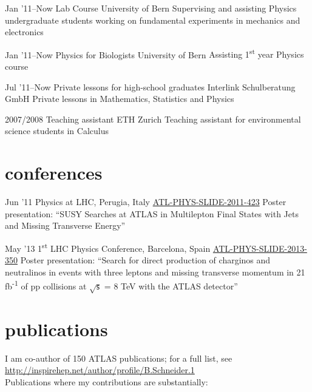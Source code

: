\documentclass[]{cv} %
\begin{document}
\begin{entrylist}

\entry
{Jan '11--Now}
{Lab Course}
{University of Bern}
{Supervising and assisting Physics undergraduate students working on fundamental experiments in mechanics and electronics}

\entry
{Jan '11--Now}
{Physics for Biologists}
{University of Bern}
{Assisting 1\textsuperscript{st} year Physics course}

\entry
{Jul '11--Now}
{Private lessons for high-school graduates}
{Interlink Schulberatung GmbH}
{Private lessons in Mathematics, Statistics and Physics}

\entry
{2007/2008}
{Teaching assistant}
{ETH Zurich}
{Teaching assistant for environmental science students in Calculus}

\end{entrylist}

\section{conferences}

\begin{entrylist}

  \entry
  {Jun '11}
  {Physics at LHC, Perugia, Italy}
  {\href{https://cds.cern.ch/record/1371922}{ATL-PHYS-SLIDE-2011-423}}
  {Poster presentation: ``SUSY Searches at ATLAS in Multilepton Final States with Jets and Missing Transverse Energy''}

  \entry
  {May '13}
  {1\textsuperscript{st} LHC Physics Conference, Barcelona, Spain}
  {\href{https://cds.cern.ch/record/1555743}{ATL-PHYS-SLIDE-2013-350}}
  {Poster presentation: ``Search for direct production of charginos and neutralinos in events with three
    leptons and missing transverse momentum in 21 fb\textsuperscript{-1} of pp collisions at $\sqrt{\mathsf{s}}$ = 8 TeV with the ATLAS
detector''}

\end{entrylist}

\section{publications}
I am co-author of 150 ATLAS publications; for a full list, see \\
\href{http://inspirehep.net/author/profile/B.Schneider.1}{http://inspirehep.net/author/profile/B.Schneider.1}\\
Publications where my contributions are substantially:
\end{document}

